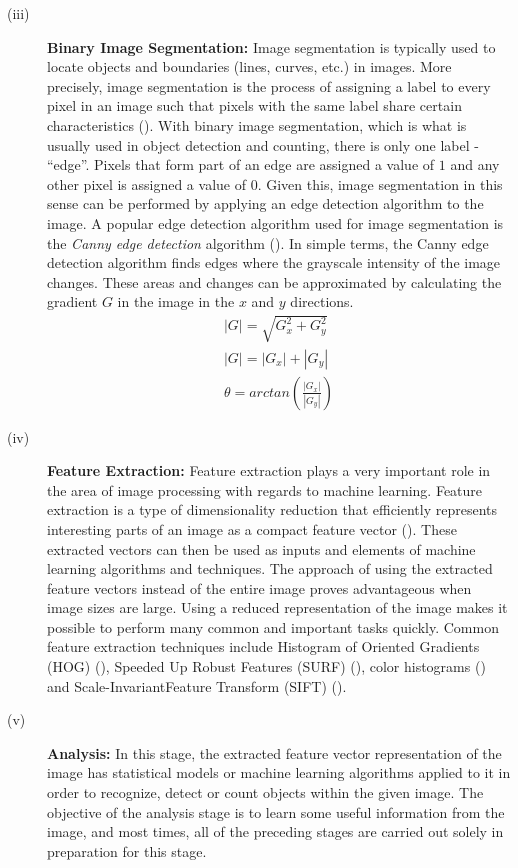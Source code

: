 \begin{description}
\item[(iii)] \textbf{Binary Image Segmentation:} Image segmentation is typically used to locate objects and boundaries (lines, curves, etc.) in images. More precisely, image segmentation is the process of assigning a label to every pixel in an image such that pixels with the same label share certain characteristics (\cite{REF7}). With binary image segmentation, which is what is usually used in object detection and counting, there is only one label - ``edge''. Pixels that form part of an edge are assigned a value of $1$ and any other pixel is assigned a value of $0$. Given this, image segmentation in this sense can be performed by applying an edge detection algorithm to the image. A popular edge detection algorithm used for image segmentation is the \textit{Canny edge detection} algorithm (\cite{REF8}). In simple terms, the Canny edge detection algorithm finds edges where the grayscale intensity of the image changes. These areas and changes can be approximated by calculating the gradient $G$ in the image in the $x$ and $y$ directions.\\
\begin{align*}
|G| = \sqrt{G_x^2 + G_y^2}\\
|G| = |G_x| + |G_y|\\
\theta = arctan(\frac{|G_x|}{|G_y|}) \tag{2}
\end{align*}

\item[(iv)] \textbf{Feature Extraction:} Feature extraction plays a very important role in the area of image processing with regards to machine learning. Feature extraction is a type of dimensionality reduction that efficiently represents interesting parts of an image as a compact feature vector (\cite{REF9}). These extracted vectors can then be used as inputs and elements of machine learning algorithms and techniques. The approach of using the extracted feature vectors instead of the entire image proves advantageous when image sizes are large. Using a reduced representation of the image makes it possible to perform many common and important tasks quickly. Common feature extraction techniques include Histogram of Oriented Gradients (HOG) (\cite{REF10}), Speeded Up Robust Features (SURF) (\cite{REF11}), color histograms (\cite{REF12}) and Scale-InvariantFeature Transform (SIFT) (\cite{REF13}).\\

\item[(v)] \textbf{Analysis:} In this stage, the extracted feature vector representation of the image has statistical models or machine learning algorithms applied to it in order to recognize, detect or count objects within the given image. The objective of the analysis stage is to learn some useful information from the image, and most times, all of the preceding stages are carried out solely in preparation for this stage.
\end{description}

